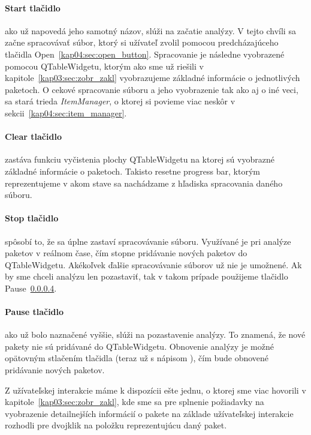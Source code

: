 \paragraph{Start tlačidlo}
\label{kap04:sec:start_button}

ako už napovedá jeho samotný názov, slúži na začatie analýzy. V tejto chvíli sa začne spracovávať súbor, ktorý si užívateľ zvolil pomocou predcházajúceho tlačidla Open~\ref{kap04:sec:open_button}. Spracovanie je následne vyobrazené pomocou QTableWidgetu, ktorým ako sme už riešili v kapitole~\ref{kap03:sec:zobr_zakl} vyobrazujeme základné informácie o jednotlivých paketoch. O cekové spracovanie súboru a jeho vyobrazenie tak ako aj o iné veci, sa stará trieda \textit{ItemManager}, o ktorej si povieme viac neskôr v sekcii~\ref{kap04:sec:item_manager}.

\paragraph{Clear tlačidlo}

zastáva funkciu vyčistenia plochy QTableWidgetu na ktorej sú vyobrazné základné informácie o paketoch. Takisto resetne progress bar, ktorým reprezentujeme v akom stave sa nachádzame z hľadiska spracovania daného súboru.

\paragraph{Stop tlačidlo}

spôsobí to, že sa úplne zastaví spracovávanie súboru. Využívané je pri analýze paketov v reálnom čase, čím stopne pridávanie nových paketov do QTableWidgetu. Akékoľvek ďalšie spracovávanie súborov už nie je umožnené. Ak by sme chceli analýzu len pozastaviť, tak v takom prípade použijeme tlačidlo Pause~\ref{kap04:sec:pause_button}.

\paragraph{Pause tlačidlo}
\label{kap04:sec:pause_button}

ako už bolo naznačené vyššie, slúži na pozastavenie analýzy. To znamená, že nové pakety nie sú pridávané do QTableWidgetu. Obnovenie analýzy je možné opätovným stlačením tlačidla (teraz už s nápisom ), čím bude obnovené pridávanie nových paketov.

Z užívateľskej interakcie máme k dispozícii ešte jednu, o ktorej sme viac hovorili v kapitole~\ref{kap03:sec:zobr_zakl}, kde sme sa pre splnenie požiadavky na vyobrazenie detailnejších informácií o pakete na základe užívateľskej interakcie rozhodli pre dvojklik na položku reprezentujúcu daný paket.

